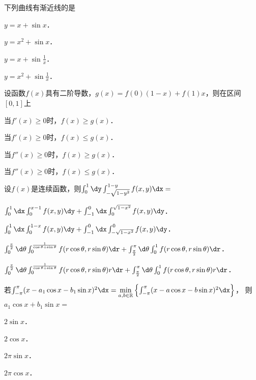 \documentclass[plain,noanswer,medmath]{../../template/jnuexam}
\begin{document}




\begin{problem}
下列曲线有渐近线的是\pickout{}
\begin{abcd}
\item $y = x + \sin x$．
\item $y = x^2 + \sin x$．
\item $y = x + \sin \frac{1}{x}$．
\item $y = x^2 + \sin \frac{1}{x}$．
\end{abcd}
\end{problem}


\begin{problem}
设函数$f(x)$具有二阶导数，$g(x) = f(0)(1 - x) + f(1)x$，则在区间$[0,1]$上\pickout{}
\begin{abcd}
\item 当$f'(x) \ge 0$时，$f(x) \ge g(x)$．
\item 当$f'(x) \ge 0$时，$f(x) \le g(x)$．
\item 当$f''(x) \ge 0$时，$f(x) \ge g(x)$．
\item 当$f''(x) \ge 0$时，$f(x) \le g(x)$．
\end{abcd}
\end{problem}


\begin{problem}
设$f(x)$是连续函数，则$\int_0^1 \dy\int_{- \sqrt{1 - y^2}}^{1 - y} f(x,y)\dx =$\pickout{}
\begin{abcd}
\item $\int_0^1 \dx\int_0^{x - 1} f(x,y)\dy + \int_{-1}^0 \dx\int_0^{\sqrt{1 - x^2}} f(x,y)\dy$．
\item $\int_0^1 \dx\int_0^{1 - x} f(x,y)\dy + \int_{-1}^0 \dx\int_{- \sqrt{1 - x^2}}^0 f(x,y)\dy$．
\item $\int_0^{\frac{\pi}{2}}\d\theta
       \int_0^{\frac{1}{\cos\theta+\sin\theta}}f(r\cos\theta,r\sin\theta)\dr
       + \int_{\frac{\pi}{2}}^{\pi}\d\theta \int_0^1 f(r\cos\theta,r\sin\theta)\dr$．
\item $\int_0^{\frac{\pi}{2}}\d\theta 
       \int_0^{\frac{1}{\cos\theta+\sin\theta}}f(r\cos\theta,r\sin\theta)r\dr
       + \int_{\frac{\pi}{2}}^{\pi}\d\theta \int_0^1 f(r\cos\theta,r\sin\theta)r\dr$．
\end{abcd}
\end{problem}


\begin{problem}
若$\int_{- \pi}^{\pi}(x - a_1\cos x - b_1\sin x)^2 \dx
= \min\limits_{a,b \in \mathbb{R}}\left\{\int_{-\pi}^{\pi}(x - a\cos x - b\sin x)^2 \dx\right\}$，
\goodbreak 则$a_1\cos x + b_1\sin x =$\pickout{}
\begin{abcd}
\item $2\sin x$．
\item $2\cos x$．
\item $2\pi \sin x$．
\item $2\pi \cos x$．
\end{abcd}
\end{problem}
\end{document}
